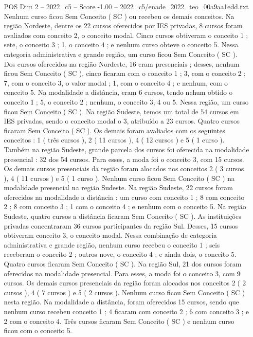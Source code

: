 \begin{textsample}{POS Dim 2 – 2022\_c5 – Score -1.00 – 2022\_c5/enade\_2022\_teo\_00a9aa1edd.txt}
Nenhum curso ficou Sem Conceito ( SC ) ou recebeu os demais conceitos.
Na região Nordeste, dentre os 22 cursos oferecidos por IES privadas, 8 cursos foram avaliados com conceito 2, o conceito modal.
Cinco cursos obtiveram o conceito 1 ; sete, o conceito 3 ; 1, o conceito 4 ; e nenhum curso obteve o conceito 5.
Nessa categoria administrativa e grande região, um curso ficou Sem Conceito ( SC ).
Dos cursos oferecidos na região Nordeste, 16 eram presenciais ; desses, nenhum ficou Sem Conceito ( SC ), cinco ficaram com o conceito 1 ; 3, com o conceito 2 ; 7, com o conceito 3, o valor modal ; 1, com o conceito 4 ; e nenhum, com o conceito 5.
Na modalidade a distância, eram 6 cursos, tendo nehum obtido o conceito 1 ; 5, o conceito 2 ; nenhum, o conceito 3, 4 ou 5.
Nessa região, um curso ficou Sem Conceito ( SC ).
Na região Sudeste, temos um total de 54 cursos em IES privadas, sendo o conceito modal o 3, atribuído a 23 cursos.
Quatro cursos ficaram Sem Conceito ( SC ).
Os demais foram avaliados com os seguintes conceitos : 1 ( três cursos ), 2 ( 11 cursos ), 4 ( 12 cursos ) e 5 ( 1 curso ).
Também na região Sudeste, grande parcela dos cursos foi oferecida na modalidade presencial : 32 dos 54 cursos.
Para esses, a moda foi o conceito 3, com 15 cursos.
Os demais cursos presenciais da região foram alocados nos conceitos 2 ( 3 cursos ), 4 ( 11 cursos ) e 5 ( 1 curso ).
Nenhum curso ficou Sem Conceito ( SC ) na modalidade presencial na região Sudeste.
Na região Sudeste, 22 cursos foram oferecidos na modalidade a distância : um curso com conceito 1 ; 8 com conceito 2 ; 8 com conceito 3 ; 1 com o conceito 4 ; e nenhum com o conceito 5.
Na região Sudeste, quatro cursos a distância ficaram Sem Conceito ( SC ).
As instituições privadas concentraram 36 cursos participantes da região Sul.
Desses, 15 cursos obtiveram conceito 3, o conceito modal.
Nessa combinação de categoria administrativa e grande região, nenhum curso recebeu o conceito 1 ; seis receberam o conceito 2 ; outros nove, o conceito 4 ; e ainda dois, o conceito 5.
Quatro cursos ficaram Sem Conceito ( SC ).
Na região Sul, 21 dos cursos foram oferecidos na modalidade presencial.
Para esses, a moda foi o conceito 3, com 9 cursos.
Os demais cursos presenciais da região foram alocados nos conceitos 2 ( 2 cursos ), 4 ( 7 cursos ) e 5 ( 2 cursos ).
Nenhum curso ficou Sem Conceito ( SC ) nesta região.
Na modalidade a distância, foram oferecidos 15 cursos, sendo que nenhum curso recebeu conceito 1 ; 4 ficaram com conceito 2 ; 6 com conceito 3 ; e 2 com o conceito 4.
Três cursos ficaram Sem Conceito ( SC ) e nenhum curso ficou com o conceito 5.

\end{textsample}

